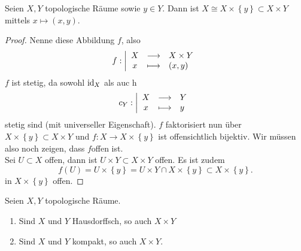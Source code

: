 \begin{corollary}
    Seien $X,Y$ topologische Räume sowie  $y\in Y$. Dann ist $X\cong X\times \left \{y\right\} \subset X\times Y$ mittels $x \mapsto (x,y)$.
\end{corollary}
\begin{proof}
    Nenne diese Abbildung $f$, also
        \begin{equation*}
        f: \left| \begin{array}{c c l} 
        X & \longrightarrow & X\times Y \\
        x & \longmapsto &  (x,y)
        \end{array} \right.
    \end{equation*}
$f$ ist stetig, da sowohl  $\mathrm{id}_X$ als auc h
    \begin{equation*}
    c_Y: \left| \begin{array}{c c l} 
    X & \longrightarrow & Y \\
    x & \longmapsto &  y
    \end{array} \right.
\end{equation*}
stetig sind (mit universeller Eigenschaft). $f$ faktorisiert nun über  $X\times \left \{y\right\} \subset X\times Y$ und $f: X \to  X\times \left \{y\right\} $ ist offensichtlich bijektiv. Wir müssen also noch zeigen, dass $f$offen ist. \\
Sei  $U\subset X$ offen, dann ist $U\times Y \subset X\times Y$ offen. Es ist zudem
\[
    f(U) = U\times \left \{y\right\}  = U\times Y \cap  X \times \left \{y\right\}  \subset X\times \left \{y\right\} 
.\] 
in $X\times \left \{y\right\} $ offen.
\end{proof}
\begin{theorem}
    Seien $X,Y$ topologische Räume.
\begin{enumerate}[1)]
        \item Sind $X$ und  $Y$ Hausdorffsch, so auch  $X\times Y$
        \item Sind $X$ und $Y$ kompakt, so auch  $X\times Y$.
    \end{enumerate}
\end{theorem}
